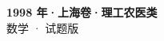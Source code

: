 \documentclass[zihao=-4, a4paper]{ctexart}
\begin{document}
\begin{center}
  {\Large\bfseries 1998 年·上海卷·理工农医类}\\[4pt]
  {\large 数学 · 试题版}
\end{center}
\medskip
{}

\end{document}
